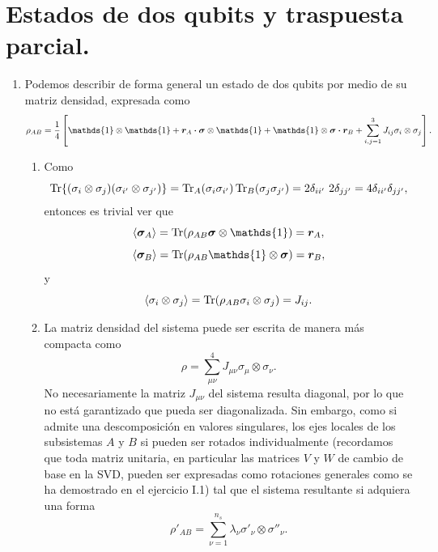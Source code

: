 \documentclass{scrartcl}
\newcommand{\inv}[1]{\frac{1}{#1}}
\renewcommand{\vb}[1]{\bm{#1}}
\DeclareRobustCommand{\[}{\begin{equation}}
\DeclareRobustCommand{\]}{\end{equation}}
\begin{document}
\section{Estados de dos qubits y traspuesta parcial.}
\begin{enumerate}
    
    \item Podemos describir de forma general un estado de dos qubits por medio de su matriz densidad, expresada como
    \[ \rho_{AB} = \inv{4} \left[ \mathds{1} \otimes \mathds{1} + \vb{r}_A \vdot \vb{\sigma} \otimes \mathds{1} + \mathds{1} \otimes \vb{\sigma} \vdot \vb{r}_B + \sum_{i, j = 1}^3 J_{ij} \sigma_i \otimes \sigma_j \right]. \label{eq:II_1_def} \]
    
    \begin{enumerate}
        \item Como
        \[ \Tr{(\sigma_i \otimes \sigma_j)(\sigma_{i'} \otimes \sigma_{j'})} = \Tr_A (\sigma_i \sigma_{i'}) \Tr_B (\sigma_j \sigma_{j'}) = 2 \delta_{i i'} \ 2 \delta_{j j'} = 4 \delta_{i i'} \delta_{j j'}, \]
        entonces es trivial ver que
        \[ \expval{\vb{\sigma}_A} = \Tr(\rho_{AB} \vb{\sigma} \otimes \mathds{1}) = \vb{r}_A, \]
        \[ \expval{\vb{\sigma}_B} = \Tr(\rho_{AB} \mathds{1} \otimes \vb{\sigma}) = \vb{r}_B, \]
        y
        \[ \expval{\sigma_i \otimes \sigma_j} = \Tr(\rho_{AB} \sigma_i \otimes \sigma_j) = J_{ij}. \]
        
        
        \item La matriz densidad del sistema puede ser escrita de manera más compacta como
        \[ \rho = \sum_{\mu\nu}^4 J_{\mu\nu} \sigma_\mu \otimes \sigma_\nu. \]
        No necesariamente la matriz $J_{\mu\nu}$ del sistema resulta diagonal, por lo que no está garantizado que pueda ser diagonalizada. Sin embargo, como si admite una descomposición en valores singulares, los ejes locales de los subsistemas $A$ y $B$ si pueden ser rotados individualmente (recordamos que toda matriz unitaria, en particular las matrices $V$ y $W$ de cambio de base en la SVD, pueden ser expresadas como rotaciones generales como se ha demostrado en el ejercicio I.1) tal que el sistema resultante si adquiera una forma
        \[ \rho'_{AB} = \sum_{\nu = 1}^{n_s} \lambda_\nu \sigma'_\nu \otimes \sigma''_\nu. \]
        

\end{enumerate}
\end{enumerate}
\end{document}
